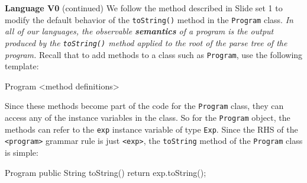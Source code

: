 \begin{minipage}[t]{\sw}
\slidenumber
\LARGE
{\bf Language V0} (continued)\exx
We follow the method described in Slide set 1
to modify the default behavior of the \verb'toString()' method
in the \verb'Program' class.
{\em In all of our languages,
the observable {\bf semantics} of a program
is the output produced by the \verb'toString()' method
applied to the root of the parse tree of the program.}\exx
Recall that to add methods to a class such as \verb'Program',
use the following template:
\Large
\begin{qv}
Program
<method definitions>
\end{qv}
\LARGE
Since these methods become part of the code for the \verb'Program' class,
they can access any of the instance variables in the class.
So for the \verb'Program' object,
the methods can refer to the \verb'exp' instance variable
of type \verb'Exp'.
Since the RHS of the \verb'<program>' grammar rule is just \verb'<exp>',
the \verb'toString' method of the \verb'Program' class is simple:
\Large
\begin{qv}
Program
    public String toString() {
        return exp.toString();
    }
\end{qv}
\end{minipage}
